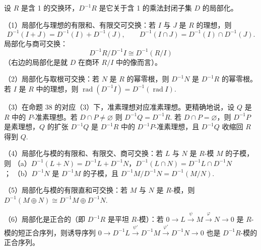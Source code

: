 \begin{proposition}\label{pro:15.42}
设 \(R\) 是含 1 的交换环，\(D^{-1}R\) 是它关于含 1 的乘法封闭子集 \(D\) 的局部化。

（1）局部化与理想的有限和、有限交可交换：若 \(I\) 与 \(J\) 是 \(R\) 的理想，则
\[
D^{-1}(I+J) = D^{-1}(I)+D^{-1}(J), \qquad D^{-1}(I \cap J) = D^{-1}(I) \cap D^{-1}(J).
\]
局部化与商可交换：
\[
D^{-1}R/D^{-1}I \cong D^{-1}(R/I)
\]
（右边的局部化是就 \(D\) 在商环 \(R/I\) 中的像而言）。

（2）局部化与取根可交换：若 \(N\) 是 \(R\) 的幂零根，则 \(D^{-1}N\) 是 \(D^{-1}R\) 的幂零根。若 \(I\) 是 \(R\) 中的理想，则 \(\operatorname{rad}(D^{-1}I) = D^{-1}(\operatorname{rad}I)\).

（3）在命题 38 的对应（3）下，准素理想对应准素理想。更精确地说，设 \(Q\) 是 \(R\) 中的 \(P\)-准素理想。若 \(D \cap P \neq \varnothing\) 则 \(D^{-1}Q = D^{-1}R\). 若 \(D \cap P = \varnothing\)，则 \(D^{-1}P\) 是素理想，\(Q\) 的扩张 \(D^{-1}Q\) 是 \(D^{-1}R\) 中的 \(D^{-1}P\)-准素理想，且 \(D^{-1}Q\) 收缩回 \(R\) 得到 \(Q\).

（4）局部化与模的有限和、有限交、商可交换：若 \(L\) 与 \(N\) 是 \(R\)-模 \(M\) 的子模，则
（a）\(D^{-1}(L+N) = D^{-1}L+D^{-1}N\)，\(D^{-1}(L \cap N) = D^{-1}L \cap D^{-1}N\)；
（b）\(D^{-1}N\) 是 \(D^{-1}M\) 的子模，且 \(D^{-1}M/D^{-1}N = D^{-1}(M/N)\).

（5）局部化与模的有限直和可交换：若 \(M\) 与 \(N\) 是 \(R\)-模，则 \(D^{-1}(M \oplus N) \cong D^{-1}M \oplus D^{-1}N\).

（6）局部化是正合的（即 \(D^{-1}R\) 是平坦 \(R\)-模）：若 \(0 \to L \xrightarrow{\psi} M \xrightarrow{\varphi} N \to 0\) 是 \(R\)-模的短正合序列，则诱导序列 \(0 \to D^{-1}L \xrightarrow{\psi'} D^{-1}M \xrightarrow{\varphi'} D^{-1}N \to 0\) 也是 \(D^{-1}R\)-模的正合序列。
\end{proposition}

